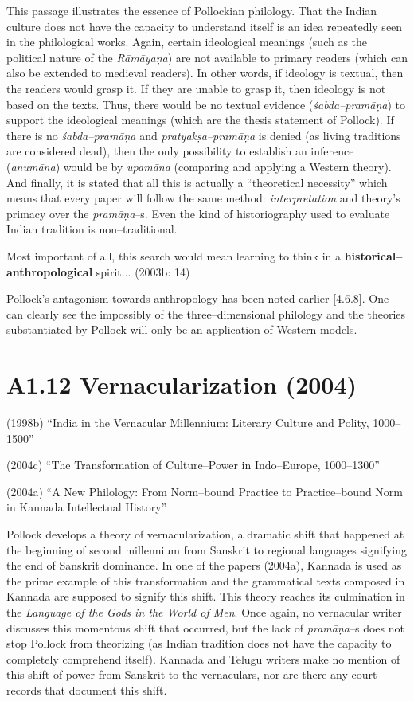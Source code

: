 This passage illustrates the essence of Pollockian philology. That the Indian culture does not have the capacity to understand itself is an idea repeatedly seen in the philological works. Again, certain ideological meanings (such as the political nature of the \textit{Rāmāyaṇa}) are not available to primary readers (which can also be extended to medieval readers). In other words, if ideology is textual, then the readers would grasp it. If they are unable to grasp it, then ideology is not based on the texts. Thus, there would be no textual evidence (\textit{śabda–pramāṇa}) to support the ideological meanings (which are the thesis statement of Pollock). If there is no \textit{śabda–pramāṇa} and \textit{pratyakṣa–pramāṇa }is denied (as living traditions are considered dead), then the only possibility to establish an inference (\textit{anumāna}) would be by \textit{upamāna} (comparing and applying a Western theory). And finally, it is stated that all this is actually a “theoretical necessity” which means that every paper will follow the same method: \textit{interpretation} and theory’s primacy over the \textit{pramāṇa}–s. Even the kind of historiography used to evaluate Indian tradition is non–traditional.

\begin{myquote}
Most important of all, this search would mean learning to think in a \textbf{historical–anthropological} spirit... (2003b: 14)
\end{myquote}

Pollock’s antagonism towards anthropology has been noted earlier [4.6.8]. One can clearly see the impossibly of the three–dimensional philology and the theories substantiated by Pollock will only be an application of Western models.

\vspace {-.4cm}

\section*{A1.12 Vernacularization (2004)}

(1998b) “India in the Vernacular Millennium: Literary Culture and Polity, 1000–1500”

(2004c) “The Transformation of Culture–Power in Indo–Europe, 1000–1300”

(2004a) “A New Philology: From Norm–bound Practice to Practice–bound Norm in Kannada Intellectual History”

Pollock develops a theory of vernacularization, a dramatic shift that happened at the beginning of second millennium from Sanskrit to regional languages signifying the end of Sanskrit dominance. In one of the papers (2004a), Kannada is used as the prime example of this transformation and the grammatical texts composed in Kannada are supposed to signify this shift. This theory reaches its culmination in the \textit{Language of the Gods in the World of Men}. Once again, no vernacular writer discusses this momentous shift that occurred, but the lack of \textit{pramāṇa}–s does not stop Pollock from theorizing (as Indian tradition does not have the capacity to completely comprehend itself). Kannada and Telugu writers make no mention of this shift of power from Sanskrit to the vernaculars, nor are there any court records that document this shift.

